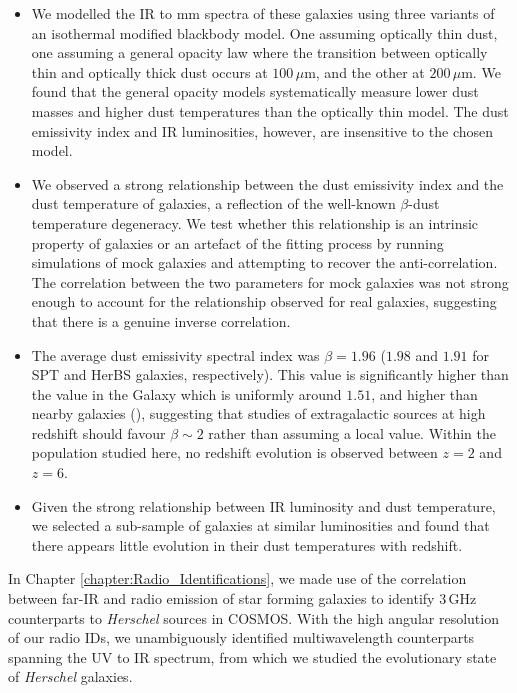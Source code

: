 \begin{itemize}
    \item We modelled the IR to mm spectra of these galaxies using three variants of an isothermal modified blackbody model. One assuming optically thin dust, one assuming a general opacity law where the transition between optically thin and optically thick dust occurs at $100\,\mu$m, and the other at $200\,\mu$m. We found that the general opacity models systematically measure lower dust masses and higher dust temperatures than the optically thin model. The dust emissivity index and IR luminosities, however, are insensitive to the chosen model.
    \item We observed a strong relationship between the dust emissivity index and the dust temperature of galaxies, a reflection of the well-known $\beta$-dust temperature degeneracy. We test whether this relationship is an intrinsic property of galaxies or an artefact of the fitting process by running simulations of mock galaxies and attempting to recover the anti-correlation. The correlation between the two parameters for mock galaxies was not strong enough to account for the relationship observed for real galaxies, suggesting that there is a genuine inverse correlation.
    \item The average dust emissivity spectral index was $\beta = 1.96$ ($1.98$ and $1.91$ for SPT and HerBS galaxies, respectively). This value is significantly higher than the value in the Galaxy which is uniformly around $1.51$, and higher than nearby galaxies (\citealt{Lamperti_2019}), suggesting that studies of extragalactic sources at high redshift should favour $\beta \sim 2$ rather than assuming a local value. Within the population studied here, no redshift evolution is observed between $z = 2$ and $z = 6$.
    \item Given the strong relationship between IR luminosity and dust temperature, we selected a sub-sample of galaxies at similar luminosities and found that there appears little evolution in their dust temperatures with redshift.
\end{itemize}

In Chapter \ref{chapter:Radio_Identifications}, we made use of the correlation between far-IR and radio emission of star forming galaxies to identify $3\,$GHz counterparts to \textit{Herschel} sources in COSMOS. With the high angular resolution of our radio IDs, we unambiguously identified multiwavelength counterparts spanning the UV to IR spectrum, from which we studied the evolutionary state of \textit{Herschel} galaxies.

